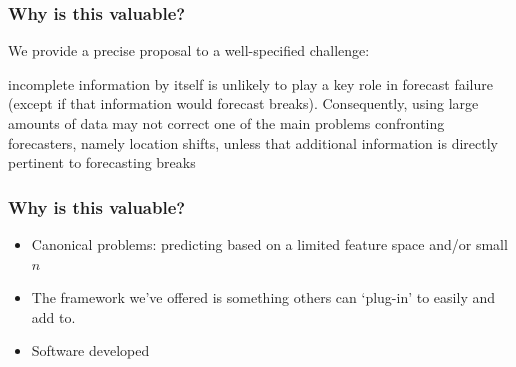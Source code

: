 \documentclass[9pt]{beamer}
\theoremstyle{definition}
\begin{document}
    \begin{frame}
        \frametitle{Why is this valuable?}

        We provide a precise proposal to a well-specified challenge:

        \begin{myquote}[colback=red!30, size=small]incomplete information by itself is unlikely to play a key role in forecast failure (except if that information would forecast breaks). Consequently, using large amounts of data may not correct one of the main problems confronting forecasters, namely location shifts, unless that additional information is directly pertinent to forecasting breaks \parencite[][]{castle2013forecasting}
        \end{myquote}

    \end{frame}

    \begin{frame}
        \frametitle{Why is this valuable?}

        \begin{itemize}
            \item Canonical problems: predicting based on a limited feature space and/or small $n$
    
            \bigskip
    
            \item The framework we've offered is something others can `plug-in' to easily and add to.
    
            \bigskip
    
            \item Software developed
        \end{itemize}

    \end{frame}
\end{document}
